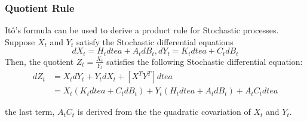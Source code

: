 \documentclass{beamer}
\begin{document}
\begin{frame}
    \frametitle{Quotient Rule}
    Itô's formula can be used to derive a product rule for Stochastic processes.\\
    Suppose $X_t$ and $Y_t$ satisfy the Stochastic differential equations
    $$dX_t = H_t dtea + A_t dB_t, dY_t = K_t dtea + C_t dB_t$$ 
    Then, the quotient $Z_t = \frac{X_t}{Y_t}$ satisfies the following Stochastic differential equation:
    \begin{align*}
        dZ_t &= X_t dY_t + Y_t dX_t + [X^TY^T] dtea\\
        &= X_t (K_t dtea + C_t dB_t) + Y_t (H_t dtea + A_t dB_t) + A_t C_t dtea
    \end{align*}
    
    the last term, $A_t C_t$ is derived from the the quadratic covariation of $X_t$ and $Y_t$.
\end{frame}
\end{document}
